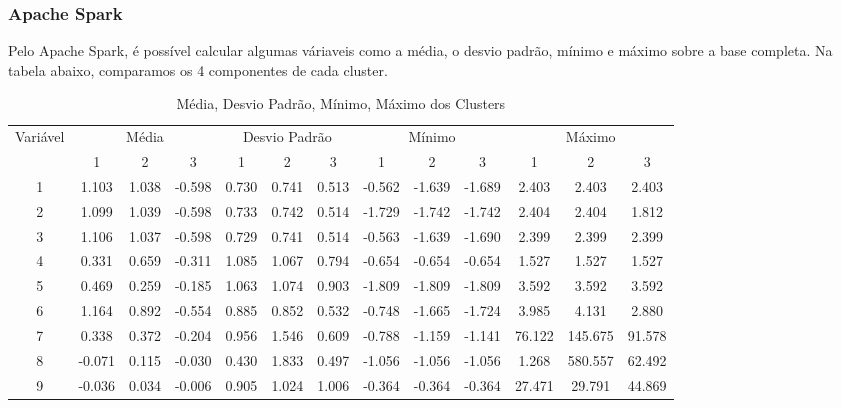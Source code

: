 \subsubsection{Apache Spark}

Pelo Apache Spark, é possível calcular algumas váriaveis como a média, o desvio padrão, mínimo e máximo sobre a base completa. Na tabela abaixo, comparamos os 4 componentes de cada cluster.

\pagebreak

\begin{table}
\tiny
\centering
        \caption{Média, Desvio Padrão, Mínimo, Máximo dos Clusters}
        \label{multiprogram}
        \begin{tabular}{c | c c c | c c c | c c c | c c c } \toprule
             Variável & \multicolumn{3}{|c|}{Média} & \multicolumn{3}{|c|}{Desvio Padrão} & \multicolumn{3}{|c|}{Mínimo} & \multicolumn{3}{|c}{Máximo}\\
             & 1 & 2 & 3 & 1 & 2 & 3 & 1 & 2 & 3 & 1 & 2 & 3\\
             \hline
            \multicolumn{1}{c|}{1} & 1.103  & 1.038  & -0.598 & 0.730 & 0.741 & 0.513 & -0.562 & -1.639 & -1.689 & 2.403   & 2.403   & 2.403  \\
            \multicolumn{1}{c|}{2} & 1.099  & 1.039  & -0.598 & 0.733 & 0.742 & 0.514 & -1.729 & -1.742 & -1.742 & 2.404   & 2.404   & 1.812  \\
            \multicolumn{1}{c|}{3} & 1.106  & 1.037  & -0.598 & 0.729 & 0.741 & 0.514 & -0.563 & -1.639 & -1.690 & 2.399   & 2.399   & 2.399  \\
            \multicolumn{1}{c|}{4} & 0.331  & 0.659  & -0.311 & 1.085 & 1.067 & 0.794 & -0.654 & -0.654 & -0.654 & 1.527   & 1.527   & 1.527  \\
            \multicolumn{1}{c|}{5} & 0.469  & 0.259  & -0.185 & 1.063 & 1.074 & 0.903 & -1.809 & -1.809 & -1.809 & 3.592   & 3.592   & 3.592  \\
            \multicolumn{1}{c|}{6} & 1.164  & 0.892  & -0.554 & 0.885 & 0.852 & 0.532 & -0.748 & -1.665 & -1.724 & 3.985   & 4.131   & 2.880  \\
            \multicolumn{1}{c|}{7} & 0.338  & 0.372  & -0.204 & 0.956 & 1.546 & 0.609 & -0.788 & -1.159 & -1.141 & 76.122  & 145.675 & 91.578 \\
            \multicolumn{1}{c|}{8} & -0.071 & 0.115  & -0.030 & 0.430 & 1.833 & 0.497 & -1.056 & -1.056 & -1.056 & 1.268   & 580.557 & 62.492 \\
            \multicolumn{1}{c|}{9} & -0.036 & 0.034  & -0.006 & 0.905 & 1.024 & 1.006 & -0.364 & -0.364 & -0.364 & 27.471  & 29.791  & 44.869 \\

\end{tabular}
\end{table}
